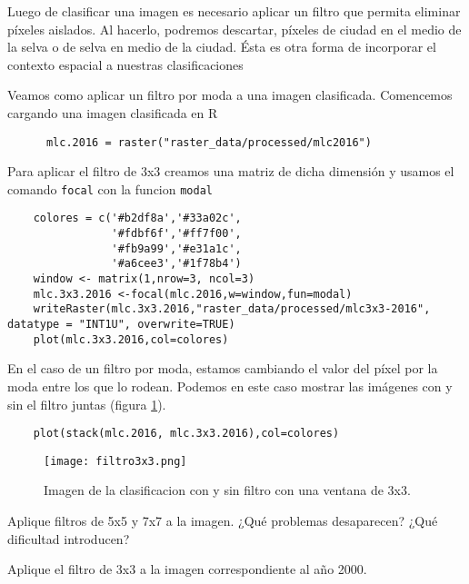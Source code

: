 Luego de clasificar una imagen es necesario aplicar un filtro que permita eliminar p\'ixeles aislados. Al hacerlo, podremos descartar, p\'ixeles de ciudad en el medio de la selva o de selva en medio de la ciudad. \'Esta es otra forma de incorporar el contexto espacial a nuestras clasificaciones
\begin{exa}
  Veamos como aplicar un filtro por moda a una imagen clasificada. Comencemos cargando una imagen clasificada en R

  \begin{lstlisting}
      mlc.2016 = raster("raster_data/processed/mlc2016")
  \end{lstlisting}

  Para aplicar el filtro de 3x3 creamos una matriz de dicha dimensi\'on y usamos el comando \texttt{focal} con la funcion \texttt{modal}

  \begin{lstlisting}
    colores = c('#b2df8a','#33a02c',
                '#fdbf6f','#ff7f00',
                '#fb9a99','#e31a1c',
                '#a6cee3','#1f78b4')
    window <- matrix(1,nrow=3, ncol=3)
    mlc.3x3.2016 <-focal(mlc.2016,w=window,fun=modal)
    writeRaster(mlc.3x3.2016,"raster_data/processed/mlc3x3-2016", datatype = "INT1U", overwrite=TRUE)
    plot(mlc.3x3.2016,col=colores)
  \end{lstlisting}

  En el caso de un filtro por moda, estamos cambiando el valor del p\'ixel por la moda entre los que lo rodean. Podemos en este caso mostrar las im\'agenes con y sin el filtro juntas (figura \ref{fig:3x3}).

  \begin{lstlisting}
    plot(stack(mlc.2016, mlc.3x3.2016),col=colores)
  \end{lstlisting}

  \begin{figure}[h!]
    \centering
    \texttt{[image: filtro3x3.png]}
    \caption{Imagen de la clasificacion con y sin filtro con una ventana de 3x3.}
    \label{fig:3x3}
  \end{figure}
\end{exa}

\begin{act}
    Aplique filtros de 5x5 y 7x7 a la imagen. ¿Qu\'e problemas desaparecen? ¿Qu\'e dificultad introducen?
\end{act}

\begin{act}
    Aplique el filtro de 3x3 a la imagen correspondiente al año 2000.
\end{act}

